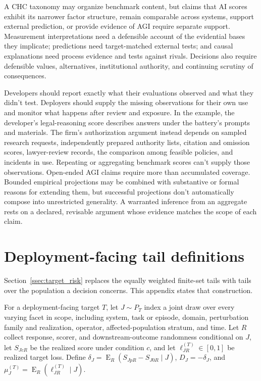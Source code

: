 \documentclass[12pt]{article}
\begin{document}
A CHC taxonomy may organize benchmark content, but claims that AI scores exhibit its narrower factor structure, remain comparable across systems, support external prediction, or provide evidence of AGI require separate support. Measurement interpretations need a defensible account of the evidential bases they implicate; predictions need target-matched external tests; and causal explanations need process evidence and tests against rivals. Decisions also require defensible values, alternatives, institutional authority, and continuing scrutiny of consequences.

Developers should report exactly what their evaluations observed and what they didn't test. Deployers should supply the missing observations for their own use and monitor what happens after review and exposure. In the example, the developer's legal-reasoning score describes answers under the battery's prompts and materials. The firm's authorization argument instead depends on sampled research requests, independently prepared authority lists, citation and omission scores, lawyer-review records, the comparison among feasible policies, and incidents in use. Repeating or aggregating benchmark scores can't supply those observations. Open-ended AGI claims require more than accumulated coverage. Bounded empirical projections may be combined with substantive or formal reasons for extending them, but successful projections don't automatically compose into unrestricted generality. A warranted inference from an aggregate rests on a declared, revisable argument whose evidence matches the scope of each claim.

\clearpage

\appendix

\section{Deployment-facing tail definitions}\label{app:deployment_tails}

Section~\ref{ssec:target_risk} replaces the equally weighted finite-set tails with tails over the population a decision concerns. This appendix states that construction.

For a deployment-facing target \(T\), let \(J\sim P_T\) index a joint draw over every varying facet in scope, including system, task or episode, domain, perturbation family and realization, operator, affected-population stratum, and time. Let \(R\) collect response, scorer, and downstream-outcome randomness conditional on \(J\), let \(S_{JcR}\) be the realized score under condition \(c\), and let \(\ell^{(T)}_{JR}\in[0,1]\) be realized target loss. Define \(\delta_J=\operatorname{E}_R(S_{JpR}-S_{J0R}\mid J)\), \(D_J=-\delta_J\), and \(\mu^{(T)}_J=\operatorname{E}_R(\ell^{(T)}_{JR}\mid J)\).
\end{document}
